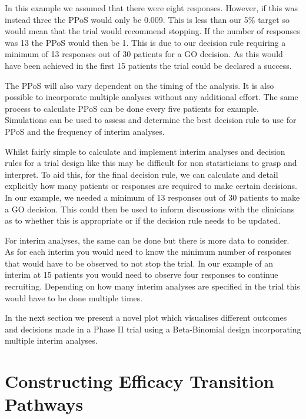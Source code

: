 In this example we assumed that there were eight responses. However, if this was instead three the PPoS would only be 0.009. This is less than our 5\% target so would mean that the trial would recommend stopping. If the number of responses was 13 the PPoS would then be 1. This is due to our decision rule requiring a minimum of 13 responses out of 30 patients for a GO decision. As this would have been achieved in the first 15 patients the trial could be declared a success. 

The PPoS will also vary dependent on the timing of the analysis. It is also possible to incorporate multiple analyses without any additional effort. The same process to calculate PPoS can be done every five patients for example. Simulations can be used to assess and determine the best decision rule to use for PPoS and the frequency of interim analyses. 

Whilst fairly simple to calculate and implement interim analyses and decision rules for a trial design like this may be difficult for non statisticians to grasp and interpret. To aid this, for the final decision rule, we can calculate and detail explicitly how many patients or responses are required to make certain decisions. In our example, we needed a minimum of 13 responses out of 30 patients to make a GO decision. This could then be used to inform discussions with the clinicians as to whether this is appropriate or if the decision rule needs to be updated. 

For interim analyses, the same can be done but there is more data to consider. As for each interim you would need to know the minimum number of responses that would have to be observed to not stop the trial. In our example of an interim at 15 patients you would need to observe four responses to continue recruiting. Depending on how many interim analyses are specified in the trial this would have to be done multiple times.

In the next section we present a novel plot which visualises different outcomes and decisions made in a Phase \RN{2} trial using a Beta-Binomial design incorporating multiple interim analyses.   


\section{Constructing Efficacy Transition Pathways}

